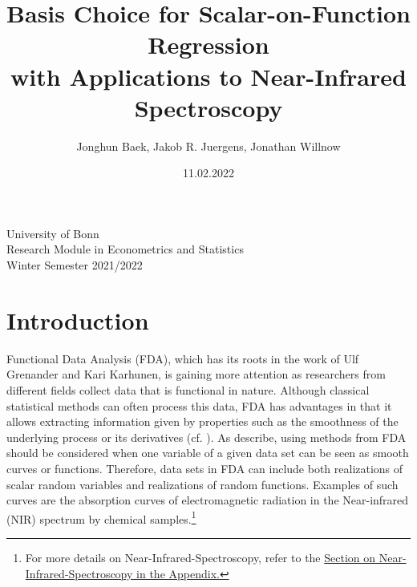 \documentclass[11pt,twoside,a4paper]{article}
\begin{document}
	\title{{\LARGE Basis Choice for Scalar-on-Function Regression \\ with Applications to Near-Infrared Spectroscopy}}
	\author{Jonghun Baek, Jakob R. Juergens, Jonathan Willnow}
	\date{11.02.2022}
	\maketitle
	\vspace{1.5 cm}
	\begin{center}
		University of Bonn \\
		Research Module in Econometrics and Statistics \\
		Winter Semester 2021/2022
	\end{center}
	
	\newpage
	
	\tableofcontents
	
	\newpage
	
	\setlength{\abovedisplayskip}{0.35cm}
	\setlength{\belowdisplayskip}{0.35cm}

	\setlength{\abovedisplayshortskip}{0.2cm}
	\setlength{\belowdisplayshortskip}{0.35cm}

	\section{Introduction}
		
	Functional Data Analysis (FDA), which has its roots in the work of Ulf Grenander and Kari Karhunen, is gaining more attention as researchers from different fields collect data that is functional in nature. Although classical statistical methods can often process this data, FDA has advantages in that it allows extracting information given by properties such as the smoothness of the underlying process or its derivatives (cf. \cite{levitin_introduction_2007}).	As \cite{kokoszka_introduction_2017} describe, using methods from FDA should be considered when one variable of a given data set can be seen as smooth curves or functions.	 
	Therefore, data sets in FDA can include both realizations of scalar random variables and realizations of random functions. Examples of such curves are the absorption curves of electromagnetic radiation in the Near-infrared (NIR) spectrum by chemical samples.\footnote{For more details on Near-Infrared-Spectroscopy, refer to the \hyperref[NIR]{Section on Near-Infrared-Spectroscopy in the Appendix.}}
	
\end{document}
